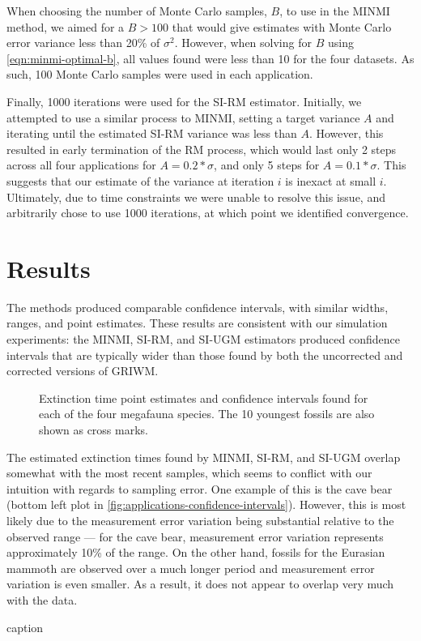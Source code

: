 When choosing the number of Monte Carlo samples, $B$, to use in the MINMI method, we aimed for a $B > 100$ that would give estimates with Monte Carlo error variance less than 20\% of $\sigma^2$. However, when solving for $B$ using \autoref{eqn:minmi-optimal-b}, all values found were less than 10 for the four datasets. As such, 100 Monte Carlo samples were used in each application.

Finally, 1000 iterations were used for the SI-RM estimator. Initially, we attempted to use a similar process to MINMI, setting a target variance $A$ and iterating until the estimated SI-RM variance was less than $A$. However, this resulted in early termination of the RM process, which would last only 2 steps across all four applications for $A  = 0.2*\sigma$, and only 5 steps for $A = 0.1*\sigma$. This suggests that our estimate of the variance at iteration $i$ is inexact at small $i$. Ultimately, due to time constraints we were unable to resolve this issue, and arbitrarily chose to use 1000 iterations, at which point we identified convergence.
\clearpage

\section{Results}

The methods produced comparable confidence intervals, with similar widths, ranges, and point estimates. These results are consistent with our simulation experiments: the MINMI, SI-RM, and SI-UGM estimators produced confidence intervals that are typically wider than those found by both the uncorrected and corrected versions of GRIWM.
\begin{figure}[ht]
    \centering
    
    \caption{Extinction time point estimates and confidence intervals found for each of the four megafauna species. The 10 youngest fossils are also shown as cross marks.}
    \label{fig:applications-confidence-intervals}
\end{figure}

The estimated extinction times found by MINMI, SI-RM, and SI-UGM overlap somewhat with the most recent samples, which seems to conflict with our intuition with regards to sampling error. One example of this is the cave bear (bottom left plot in \autoref{fig:applications-confidence-intervals}). However, this is most likely due to the measurement error variation being substantial relative to the observed range --- for the cave bear, measurement error variation represents approximately 10\% of the range. On the other hand, fossils for the Eurasian mammoth are observed over a much longer period and measurement error variation is even smaller. As a result, it does not appear to overlap very much with the data.
\begin{table}[ht]
    \centering
    \caption{caption}
    
    \label{tab:applications-sigma-range-ratios}
    \vspace{-4mm}
\end{table}

